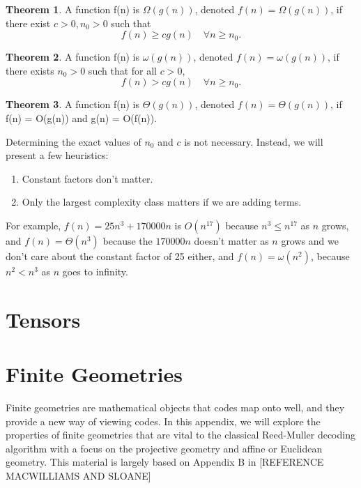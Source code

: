 \documentclass[12pt,twoside]{reedthesis}
\theoremstyle{definition}
\newtheorem{theorem}{Theorem}[chapter]
\begin{document}
\begin{theorem}
A function f(n) is $\Omega(g(n))$, denoted $f(n) = \Omega(g(n))$, if there exist $c>0, n_0>0$ such that
$$f(n) \geq c g(n) \quad \forall n\geq n_0.$$
\end{theorem}

\begin{theorem}
A function f(n) is $\omega(g(n))$, denoted $f(n) = \omega(g(n))$, if there exists $n_0>0$ such that for all $c>0$,
$$f(n) > c g(n) \quad \forall n\geq n_0.$$
\end{theorem}

\begin{theorem}
A function f(n) is $\Theta(g(n))$, denoted $f(n) = \Theta(g(n))$, if f(n) = O(g(n)) and g(n) = O(f(n)).
\end{theorem}

Determining the exact values of $n_0$ and $c$ is not necessary. Instead, we will present a few heuristics:
\begin{enumerate}
\item Constant factors don't matter. 
\item Only the largest complexity class matters if we are adding terms.
\end{enumerate}
For example, $f(n)= 25n^3 + 170000n$ is $O(n^{17})$ because $n^3 \leq n^{17} $ as $n$ grows, and $f(n) = \Theta(n^3)$ because the $170000n$ doesn't matter as $n$ grows and we don't care about the constant factor of 25 either, and $f(n) = \omega(n^2)$, because $n^2 < n^3$ as $n$ goes to infinity.

	
\chapter{Tensors}
\chapter{Finite Geometries} \label{finite_geom_chapter}
Finite geometries are mathematical objects that codes map onto well, and they provide a new way of viewing codes. In this appendix, we will explore the properties of finite geometries that are vital to the classical Reed-Muller decoding algorithm with a focus on the projective geometry and affine or Euclidean geometry. This material is largely based on Appendix B in [REFERENCE MACWILLIAMS AND SLOANE]
\end{document}
